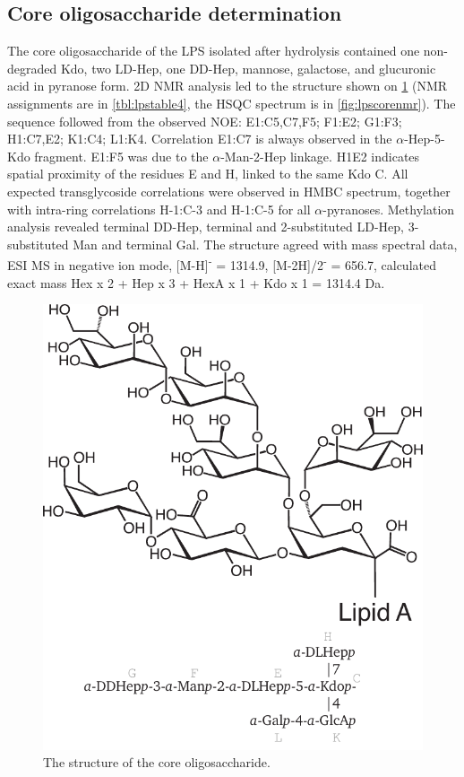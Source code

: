 \subsection{Core oligosaccharide determination} %
\label{sub:core_oligosaccharide_determination}

The core oligosaccharide of the \caulobacter{} \ac{LPS} isolated after  hydrolysis
contained one non-degraded Kdo, two LD-Hep, one DD-Hep, mannose, galactose, and glucuronic acid in
pyranose form. 2D \ac{NMR} analysis led to the structure shown on \cref{fig:lpscore} (\ac{NMR}
assignments are in \cref{tbl:lpstable4}, the \ac{HSQC} spectrum is in \cref{fig:lpscorenmr}). The
sequence followed from the observed \ac{NOE}: E1:C5,C7,F5; F1:E2; G1:F3; H1:C7,E2; K1:C4;
L1:K4. Correlation E1:C7 is always observed in the $\alpha$-Hep-5-Kdo fragment. E1:F5 was due to
the $\alpha$-Man-2-Hep linkage. H1E2 indicates spatial proximity of the residues E and H, linked
to the same Kdo C. All expected transglycoside correlations were observed in \ac{HMBC} spectrum,
together with intra-ring correlations H-1:C-3 and H-1:C-5 for all $\alpha$-pyranoses. Methylation
analysis revealed terminal DD-Hep, terminal and 2-substituted LD-Hep, 3-substituted Man and
terminal Gal. The structure agreed with mass spectral data, \ac{ESI} \ac{MS} in negative ion mode,
[M-H]\textsuperscript{-} = 1314.9, [M-2H]/2\textsuperscript{-} = 656.7, calculated exact mass Hex
x 2 + Hep x 3 + HexA x 1 + Kdo x 1 = 1314.4 Da.

\begin{figure}[htb]
  \begin{center}
    \includegraphics[]{lps_chapter/img/lpscore.pdf}
  \end{center}
  \caption{The structure of the \caulobacter core oligosaccharide.}
  \label{fig:lpscore}
\end{figure}


